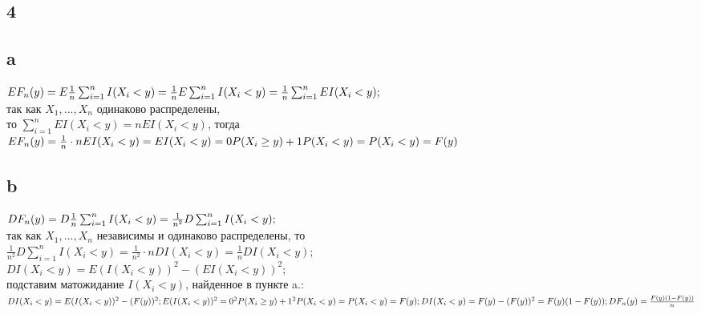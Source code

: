 \documentclass{article}
\begin{document}
\begin{large}
	\section*{4}
	\subsection*{a}
	$
	EF_n(y)=E\frac{1}{n}\sum_{i=1}^{n}I(X_i<y)=\\
	\frac{1}{n}E\sum_{i=1}^{n}I(X_i<y)=\\
	\frac{1}{n}\sum_{i=1}^{n}EI(X_i<y);
	$\\
	так как $X_1,...,X_n$ одинаково распределены,\\
	то $\sum_{i=1}^{n}EI(X_i<y)=nEI(X_i<y)$, тогда\\
	$
	EF_n(y)=\frac{1}{n}\cdot nEI(X_i<y)=EI(X_i<y)=\\
	0P(X_i\ge y)+1P(X_i<y)=P(X_i<y)=F(y)
	$
	\subsection*{b}
	$
	DF_n(y)=D\frac{1}{n}\sum_{i=1}^{n}I(X_i<y)=\\
	\frac{1}{n^2}D\sum_{i=1}^{n}I(X_i<y);
	$\\
	так как $X_1,...,X_n$ независимы и одинаково распределены, то\\
	$
	\frac{1}{n^2}D\sum_{i=1}^{n}I(X_i<y)=\frac{1}{n^2}\cdot nDI(X_i<y)=\frac{1}{n}DI(X_i<y);
	$\\
	$DI(X_i<y)=E(I(X_i<y))^2-(EI(X_i<y))^2$;\\
	подставим матожидание $I(X_i<y)$, найденное в пункте a.:\\
	$
	DI(X_i<y)=E(I(X_i<y))^2-(F(y))^2;\\
	E(I(X_i<y))^2=0^2P(X_i\ge y)+1^2P(X_i<y)=P(X_i<y)=F(y);\\
	DI(X_i<y)=F(y)-(F(y))^2=F(y)(1-F(y));\\
	DF_n(y)=\frac{F(y)(1-F(y))}{n}
	$

\end{large}
\end{document}
